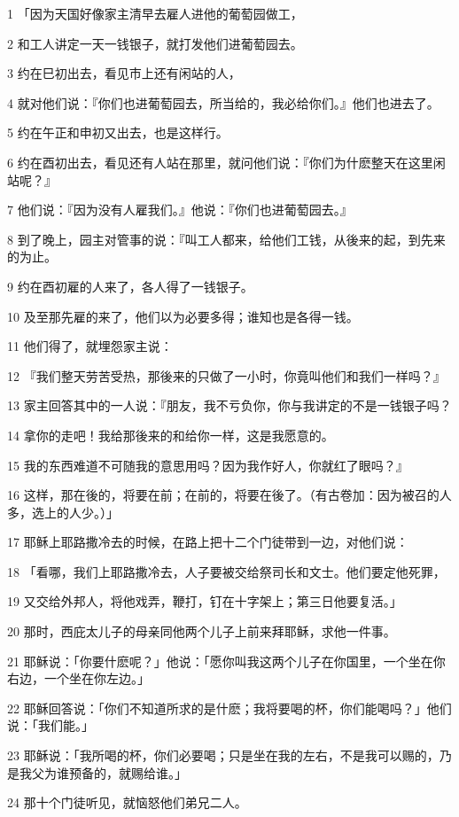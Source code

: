 \par 1 「因为天国好像家主清早去雇人进他的葡萄园做工，
\par 2 和工人讲定一天一钱银子，就打发他们进葡萄园去。
\par 3 约在巳初出去，看见市上还有闲站的人，
\par 4 就对他们说：『你们也进葡萄园去，所当给的，我必给你们。』他们也进去了。
\par 5 约在午正和申初又出去，也是这样行。
\par 6 约在酉初出去，看见还有人站在那里，就问他们说：『你们为什麽整天在这里闲站呢？』
\par 7 他们说：『因为没有人雇我们。』他说：『你们也进葡萄园去。』
\par 8 到了晚上，园主对管事的说：『叫工人都来，给他们工钱，从後来的起，到先来的为止。
\par 9 约在酉初雇的人来了，各人得了一钱银子。
\par 10 及至那先雇的来了，他们以为必要多得；谁知也是各得一钱。
\par 11 他们得了，就埋怨家主说：
\par 12 『我们整天劳苦受热，那後来的只做了一小时，你竟叫他们和我们一样吗？』
\par 13 家主回答其中的一人说：『朋友，我不亏负你，你与我讲定的不是一钱银子吗？
\par 14 拿你的走吧！我给那後来的和给你一样，这是我愿意的。
\par 15 我的东西难道不可随我的意思用吗？因为我作好人，你就红了眼吗？』
\par 16 这样，那在後的，将要在前；在前的，将要在後了。（有古卷加：因为被召的人多，选上的人少。）」
\par 17 耶稣上耶路撒冷去的时候，在路上把十二个门徒带到一边，对他们说：
\par 18 「看哪，我们上耶路撒冷去，人子要被交给祭司长和文士。他们要定他死罪，
\par 19 又交给外邦人，将他戏弄，鞭打，钉在十字架上；第三日他要复活。」
\par 20 那时，西庇太儿子的母亲同他两个儿子上前来拜耶稣，求他一件事。
\par 21 耶稣说：「你要什麽呢？」他说：「愿你叫我这两个儿子在你国里，一个坐在你右边，一个坐在你左边。」
\par 22 耶稣回答说：「你们不知道所求的是什麽；我将要喝的杯，你们能喝吗？」他们说：「我们能。」
\par 23 耶稣说：「我所喝的杯，你们必要喝；只是坐在我的左右，不是我可以赐的，乃是我父为谁预备的，就赐给谁。」
\par 24 那十个门徒听见，就恼怒他们弟兄二人。
